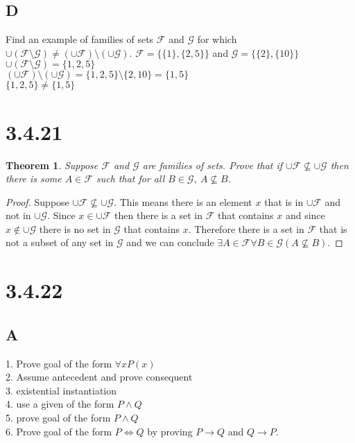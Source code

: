 \documentclass{article}
\newcommand{\F}{\mathcal{F}}
\newcommand{\G}{\mathcal{G}}
\newtheorem*{theorem}{Theorem}  %
\begin{document}
\subsection*{D}
Find an example of families of sets $\F$ and $\G$ for which $\cup(\F \setminus \G) \neq (\cup \F) \setminus (\cup \G)$.
$\F = \{\{1\}, \{2,5\}\}$ and $ \G = \{\{2\}, \{10\}\}$ \\
$\cup (\F \setminus \G) = \{1,2,5\}$ \\
$(\cup \F) \setminus (\cup \G) = \{1,2,5\} \setminus \{2,10\} = \{1,5\}$ \\
$ \{1,2,5\} \neq \{1,5\}$

\section*{3.4.21}
\begin{theorem}Suppose $\F$ and $\G$ are families of sets. Prove that if $\cup \F \nsubseteq \cup \G$ then there is some $A \in \F$ such that for all $B \in \G$, $A \nsubseteq B$.
\end{theorem}

\begin{proof}
Suppose $\cup \F \nsubseteq \cup \G$. This means there is an element $x$ that is in $\cup \F$ and not in $\cup \G$. Since $x \in \cup \F$ then there is a set in $\F$ that contains $x$ and since $x \notin \cup \G$ there is no set in $\G$ that contains $x$. Therefore there is a set in $\F$ that is not a subset of any set in $\G$ and we can conclude $\exists A \in \F \forall B \in \G (A \nsubseteq B)$.
\end{proof}

\section*{3.4.22}
\subsection*{A}
1. Prove goal of the form $\forall x P(x)$ \\
2. Assume antecedent and prove consequent \\
3. existential instantiation \\
4. use a given of the form $P \land Q$ \\
5. prove goal of the form $P \land Q$ \\
6. Prove goal of the form $P \iff Q$ by proving $P \rightarrow Q$ and $Q \rightarrow P$.
\end{document}
